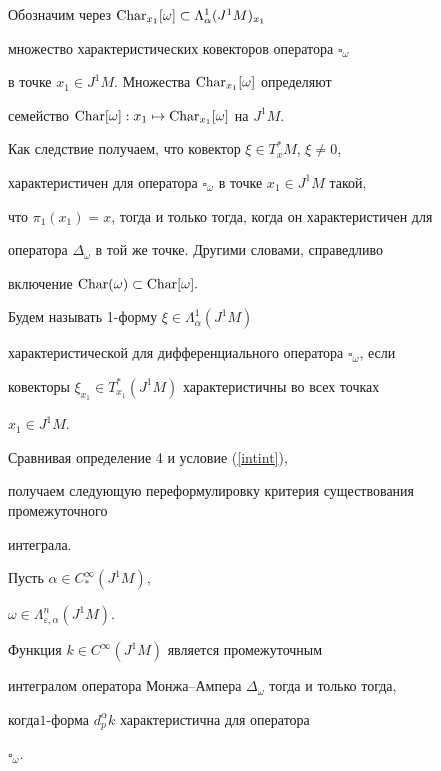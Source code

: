 Обозначим через $\operatorname{Char}_{x_1}[\omega]\subset\Lambda_\alpha^1(J^1M)_{x_1}$


множество характеристических ковекторов оператора $\square_\omega$


в точке $x_1\in J^1M$. Множества $\operatorname{Char}_{x_1}[\omega ]$ определяют


семейство ${\operatorname{Char}}[\omega]:x_1\mapsto {\operatorname{Char}}_{x_1}[\omega ]$ на $J^1M$.


Как следствие получаем, что ковектор $\xi \in T_x^{*}M$, $\xi \neq 0$,


характеристичен для оператора $\square_\omega$ в точке $x_1\in J^1M$ такой,


что $\pi_1(x_1)=x$, тогда и только тогда, когда он характеристичен для


оператора $\Delta_\omega $ в той же точке. Другими словами, справедливо


включение ${\operatorname{Char}}(\omega )\subset {\operatorname{Char}}[\omega ].$


 


Будем называть 1-форму $\xi \in \Lambda_\alpha^1(J^1M)$ 


характеристической для дифференциального оператора $\square_\omega$, если 


ковекторы $\xi_{x_1}\in T_{x_1}^{*}(J^1M)$ характеристичны во всех точках 


$x_1\in J^1M$.





Сравнивая определение 4 и условие (\ref{intint}),


получаем следующую переформулировку критерия существования промежуточного


интеграла.





\begin{prop} \label{integral6}


Пусть $\alpha \in C_{*}^\infty (J^1M)$,


$\omega \in \Lambda_{\varepsilon,\alpha }^n(J^1M)$.


Функция $k\in C^\infty (J^1M)$ является промежуточным


интегралом оператора Монжа--Ампера $\Delta_\omega$ тогда и только тогда,


когда\linebreak $1$-форма $d_p^\alpha k$ характеристична для оператора


$\square_\omega$. 


\end{prop}





